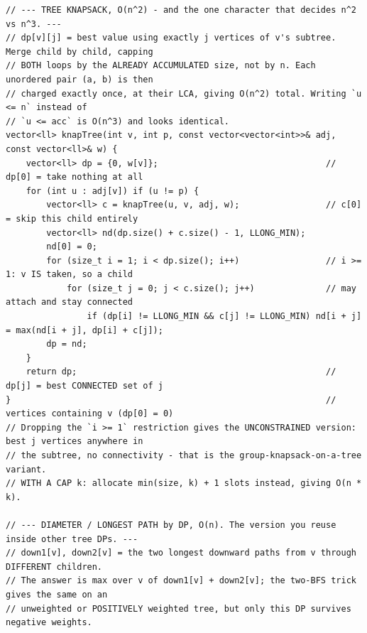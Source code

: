 \documentclass[9pt,a4paper,twocolumn]{extarticle}
\begin{document}
\begin{lstlisting}
// --- TREE KNAPSACK, O(n^2) - and the one character that decides n^2 vs n^3. ---
// dp[v][j] = best value using exactly j vertices of v's subtree. Merge child by child, capping
// BOTH loops by the ALREADY ACCUMULATED size, not by n. Each unordered pair (a, b) is then
// charged exactly once, at their LCA, giving O(n^2) total. Writing `u <= n` instead of
// `u <= acc` is O(n^3) and looks identical.
vector<ll> knapTree(int v, int p, const vector<vector<int>>& adj, const vector<ll>& w) {
    vector<ll> dp = {0, w[v]};                                 // dp[0] = take nothing at all
    for (int u : adj[v]) if (u != p) {
        vector<ll> c = knapTree(u, v, adj, w);                 // c[0] = skip this child entirely
        vector<ll> nd(dp.size() + c.size() - 1, LLONG_MIN);
        nd[0] = 0;
        for (size_t i = 1; i < dp.size(); i++)                 // i >= 1: v IS taken, so a child
            for (size_t j = 0; j < c.size(); j++)              // may attach and stay connected
                if (dp[i] != LLONG_MIN && c[j] != LLONG_MIN) nd[i + j] = max(nd[i + j], dp[i] + c[j]);
        dp = nd;
    }
    return dp;                                                 // dp[j] = best CONNECTED set of j
}                                                              // vertices containing v (dp[0] = 0)
// Dropping the `i >= 1` restriction gives the UNCONSTRAINED version: best j vertices anywhere in
// the subtree, no connectivity - that is the group-knapsack-on-a-tree variant.
// WITH A CAP k: allocate min(size, k) + 1 slots instead, giving O(n * k).

// --- DIAMETER / LONGEST PATH by DP, O(n). The version you reuse inside other tree DPs. ---
// down1[v], down2[v] = the two longest downward paths from v through DIFFERENT children.
// The answer is max over v of down1[v] + down2[v]; the two-BFS trick gives the same on an
// unweighted or POSITIVELY weighted tree, but only this DP survives negative weights.


\end{lstlisting}
\end{document}
